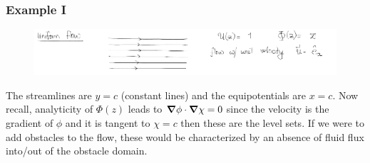 \documentclass[a4paper,12pt]{article}
\begin{document}
\subsubsection{Example I}
\begin{figure}[H]
	\centering
	\includegraphics[width=0.8\linewidth]{8}
	\caption{}
	\label{fig:4}
\end{figure}
The streamlines are $y=c$ (constant lines) and the equipotentials are $x=c$. Now recall, analyticity of $\Phi(z)$ leads to $\grad \phi\cdot\grad \chi=0 $ since the velocity is the gradient of $\phi$ and it is tangent to $\chi=c$ then these are the level sets. If we were to add obstacles to the flow, these would be characterized by an absence of fluid flux into/out of the obstacle domain. 
\end{document}
